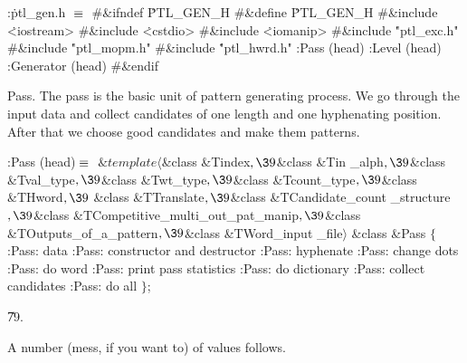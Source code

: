 \Y\B\4:\.{ptl\_gen.h }\X${}\equiv{}$\6
\8\#\&{ifndef} \.{PTL\_GEN\_H}\6
\8\#\&{define} \.{PTL\_GEN\_H}\6
\8\#\&{include} \.{<iostream>}\6
\8\#\&{include} \.{<cstdio>}\6
\8\#\&{include} \.{<iomanip>}\6
\8\#\&{include} \.{"ptl\_exc.h"}\6
\8\#\&{include} \.{"ptl\_mopm.h"}\6
\8\#\&{include} \.{"ptl\_hwrd.h"}\6
:Pass (head)\X\6
:Level (head)\X\6
:Generator (head)\X\6
\8\#\&{endif}\par
\fi

Pass. The pass is the basic unit of pattern generating process.
We go through the input data and collect candidates of one length and
one hyphenating position. After that we choose good candidates and make
them patterns.

\Y\B\4:Pass (head)\X${}\equiv{}$\6
$\&{template}\langle{}$\&{class} \&{Tindex}${},\39{}$\&{class} \&{Tin%
\_alph}${},\39{}$\&{class} \&{Tval\_type}${},\39{}$\&{class} \&{Twt\_type}${},%
\39{}$\&{class} \&{Tcount\_type}${},\39{}$\&{class} \&{THword}${},\39{}$%
\&{class} \&{TTranslate}${},\39{}$\&{class} \&{TCandidate\_count%
\_structure}${},\39{}$\&{class} \&{TCompetitive\_multi\_out\_pat\_manip}${},%
\39{}$\&{class} \&{TOutputs\_of\_a\_pattern}${},\39{}$\&{class} \&{TWord\_input%
\_file}${}\rangle{}$\6
\&{class} \&{Pass} ${}\{{}$\1\6
:Pass: data\X\6
:Pass: constructor and destructor\X\7
:Pass: hyphenate\X\6
:Pass: change dots\X\6
:Pass: do word\X\6
:Pass: print pass statistics\X\6
:Pass: do dictionary\X\6
:Pass: collect candidates\X\6
:Pass: do all\X\2\6
${}\}{}$;\par
\U79.\fi

A number (mess, if you want to) of values follows.

